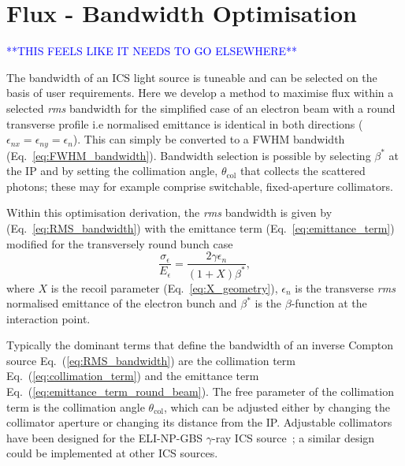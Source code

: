 \documentclass[../main.tex]{subfiles}
\begin{document}
\section{Flux - Bandwidth Optimisation}

\textcolor{blue}{**THIS FEELS LIKE IT NEEDS TO GO ELSEWHERE**}

The bandwidth of an ICS light source is tuneable and can be selected on the basis of user requirements. Here we develop a method to maximise flux within a selected \textit{rms} bandwidth for the simplified case of an electron beam with a round transverse profile i.e normalised emittance is identical in both directions ($\epsilon_{nx} = \epsilon_{ny} = \epsilon_{n}$). This can simply be converted to a FWHM bandwidth (Eq.~\ref{eq:FWHM_bandwidth}). Bandwidth selection is possible by selecting $\beta^{*}$ at the IP and by setting the collimation angle, $\theta_{\mathrm{col}}$ that collects the scattered photons; these may for example comprise switchable, fixed-aperture collimators.

Within this optimisation derivation, the \textit{rms} bandwidth is given by (Eq.~\ref{eq:RMS_bandwidth}) with the emittance term (Eq.~\ref{eq:emittance_term}) modified for the transversely round bunch case
\begin{equation}
\frac{\sigma_{\epsilon}}{E_{\epsilon}} = \frac{2\gamma\epsilon_{n}}{\left(1+X\right)\beta^{*}},
\label{eq:emittance_term_round_beam}    
\end{equation}
where $X$ is the recoil parameter (Eq.~\ref{eq:X_geometry}), $\epsilon_{n}$ is the transverse \textit{rms} normalised emittance of the electron bunch and $\beta^{*}$ is the $\beta$-function at the interaction point.

Typically the dominant terms that define the bandwidth of an inverse Compton source Eq.~(\ref{eq:RMS_bandwidth}) are the collimation term Eq.~(\ref{eq:collimation_term}) and the emittance term Eq.~(\ref{eq:emittance_term_round_beam}). The free parameter of the collimation term is the collimation angle $\theta_{\mathrm{col}}$, which can be adjusted either by changing the collimator aperture or changing its distance from the IP. Adjustable collimators have been designed for the ELI-NP-GBS $\gamma$-ray ICS source~\cite{paterno2017collimation}; a similar design could be implemented at other ICS sources.
\end{document}
